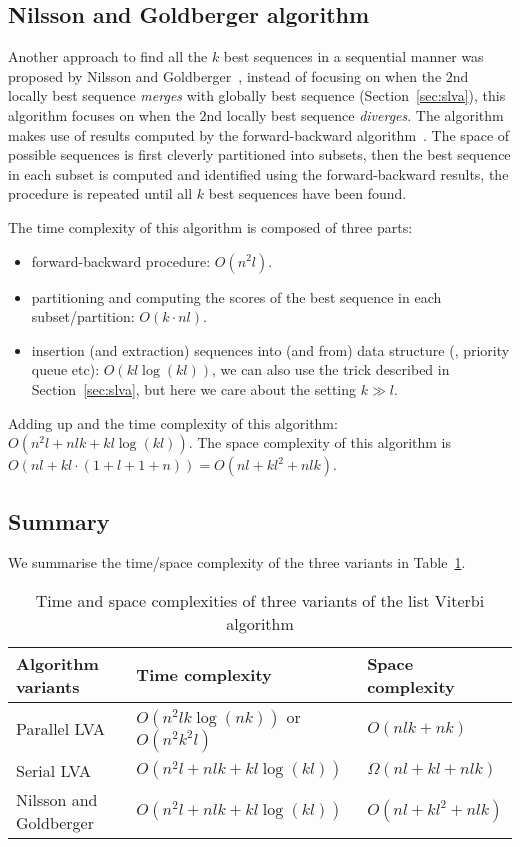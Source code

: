 \subsection{Nilsson and Goldberger algorithm}
\label{sec:nglva}

Another approach to find all the $k$ best sequences in a sequential manner was proposed by Nilsson and Goldberger~\cite{nilsson2001sequentially},
instead of focusing on when the $2$nd locally best sequence \textit{merges} with globally best sequence (Section~\ref{sec:slva}),
this algorithm focuses on when the $2$nd locally best sequence \textit{diverges}.
The algorithm makes use of results computed by the forward-backward algorithm~\cite{rabiner1989tutorial}.
The space of possible sequences is first cleverly partitioned into subsets, 
then the best sequence in each subset is computed and identified using the forward-backward results,
the procedure is repeated until all $k$ best sequences have been found.

The time complexity of this algorithm is composed of three parts:
\begin{itemize}
\item forward-backward procedure: $O(n^2 l)$.
\item partitioning and computing the scores of the best sequence in each subset/partition: $O(k \cdot nl)$.
\item insertion (and extraction) sequences into (and from) data structure (\eg, priority queue etc): $O(kl \log (kl))$,
      we can also use the trick described in Section~\ref{sec:slva}, but here we care about the setting $k \gg l$.
\end{itemize}
Adding up and the time complexity of this algorithm: $O \left( n^2 l + nlk + kl\log(kl) \right)$.
The space complexity of this algorithm is $O (nl + kl \cdot (1 + l + 1 + n) ) = O(nl + kl^2 + nlk)$.


\subsection{Summary}
We summarise the time/space complexity of the three variants in Table~\ref{tab:variants}.

\begin{table}[ht]
\caption{Time and space complexities of three variants of the list Viterbi algorithm}
\label{tab:variants}
\centering
\begin{tabular}{|l|l|l|} \hline
\textbf{Algorithm variants}  & \textbf{Time complexity} & \textbf{Space complexity} \\ \hline
Parallel LVA~\cite{seshadri1994list} & $O \left( n^2 lk \log(nk) \right)$ or $O \left( n^2 k^2 l \right)$ & $O(nlk + nk)$ \\ \hline
Serial LVA~\cite{seshadri1994list}   & $O \left( n^2 l + nlk + kl\log(kl) \right)$ & $\Omega(nl + kl + nlk)$ \\ \hline
Nilsson and Goldberger~\cite{nilsson2001sequentially} & $O \left( n^2 l + nlk + kl\log(kl) \right)$ & $O(nl + kl^2 + nlk)$ \\ \hline
\end{tabular}
\end{table}


